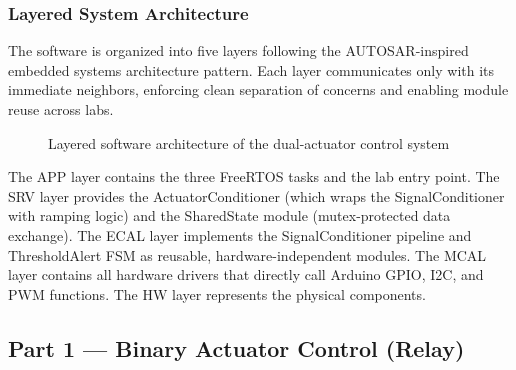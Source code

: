 \subsubsection{Layered System Architecture}

The software is organized into five layers following the AUTOSAR-inspired embedded systems architecture pattern. Each layer communicates only with its immediate neighbors, enforcing clean separation of concerns and enabling module reuse across labs.

\begin{figure}[H]
\centering
{}
\caption{Layered software architecture of the dual-actuator control system}
\label{fig:layered_architecture}
\end{figure}

The APP layer contains the three FreeRTOS tasks and the lab entry point. The SRV layer provides the ActuatorConditioner (which wraps the SignalConditioner with ramping logic) and the SharedState module (mutex-protected data exchange). The ECAL layer implements the SignalConditioner pipeline and ThresholdAlert FSM as reusable, hardware-independent modules. The MCAL layer contains all hardware drivers that directly call Arduino GPIO, I2C, and PWM functions. The HW layer represents the physical components.

\subsection{Part 1 --- Binary Actuator Control (Relay)}

